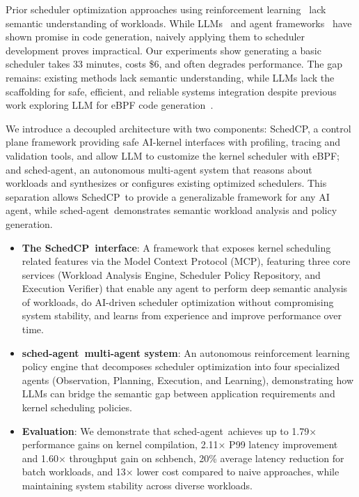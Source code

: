 \documentclass[preprint]{article}
\newcommand{\sys}{SchedCP\xspace}
\newcommand{\agent}{sched-agent\xspace}
\begin{document}
Prior scheduler optimization approaches using reinforcement learning~\cite{mao2019decima,qiu2020firm} lack semantic understanding of workloads. While LLMs~\cite{openai2023gpt4,anthropic2024claude} and agent frameworks~\cite{autogen,geminicli,claudecode,qian2024chatdev,hong2023metagpt} have shown promise in code generation, naively applying them to scheduler development proves impractical. Our experiments show generating a basic scheduler takes 33 minutes, costs \$6, and often degrades performance. The gap remains: existing methods lack semantic understanding, while LLMs lack the scaffolding for safe, efficient, and reliable systems integration despite previous work exploring LLM for eBPF code generation~\cite{kgent}.

We introduce a decoupled architecture with two components: \sys, a control plane framework providing safe AI-kernel interfaces with profiling, tracing and validation tools, and allow LLM to customize the kernel scheduler with eBPF; and \agent, an autonomous multi-agent system that reasons about workloads and synthesizes or configures existing optimized schedulers. This separation allows \sys\ to provide a generalizable framework for any AI agent, while \agent\ demonstrates semantic workload analysis and policy generation.

\begin{itemize}
    \item \textbf{The \sys\ interface}: A framework that exposes kernel scheduling related features via the Model Context Protocol (MCP), featuring three core services (Workload Analysis Engine, Scheduler Policy Repository, and Execution Verifier) that enable any agent to perform deep semantic analysis of workloads, do AI-driven scheduler optimization without compromising system stability, and learns from experience and improve performance over time.
    \item \textbf{\agent\ multi-agent system}: An autonomous reinforcement learning policy engine that decomposes scheduler optimization into four specialized agents (Observation, Planning, Execution, and Learning), demonstrating how LLMs can bridge the semantic gap between application requirements and kernel scheduling policies.
    \item \textbf{Evaluation}: We demonstrate that \agent\ achieves up to 1.79× performance gains on kernel compilation, 2.11× P99 latency improvement and 1.60× throughput gain on schbench, 20\% average latency reduction for batch workloads, and 13× lower cost compared to naive approaches, while maintaining system stability across diverse workloads.
\end{itemize}
\end{document}
